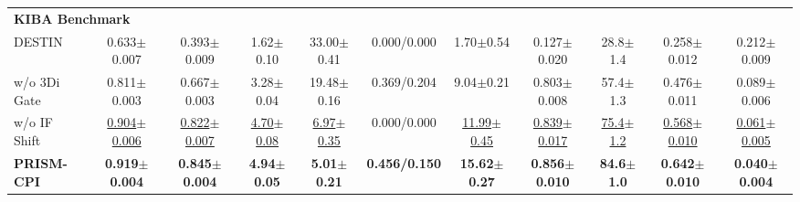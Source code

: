 \begin{table}[H]
{{\begin{tabular}{l cccccccccc}
\midrule
\multicolumn{11}{l}{\textbf{KIBA Benchmark}} \\
\hspace{3pt}DESTIN & 0.633${\pm}$0.007 & 0.393${\pm}$0.009 & 1.62${\pm}$0.10 & 33.00${\pm}$0.41 & 0.000/0.000 & 1.70${\pm}$0.54 & 0.127${\pm}$0.020 & 28.8${\pm}$1.4 & 0.258${\pm}$0.012 & 0.212${\pm}$0.009 \\
\hspace{3pt}w/o 3Di Gate & 0.811${\pm}$0.003 & 0.667${\pm}$0.003 & 3.28${\pm}$0.04 & 19.48${\pm}$0.16 & 0.369/0.204 & 9.04${\pm}$0.21 & 0.803${\pm}$0.008 & 57.4${\pm}$1.3 & 0.476${\pm}$0.011 & 0.089${\pm}$0.006 \\
\hspace{3pt}w/o IF Shift & \underline{0.904${\pm}$0.006} & \underline{0.822${\pm}$0.007} & \underline{4.70${\pm}$0.08} & \underline{6.97${\pm}$0.35} & 0.000/0.000 & \underline{11.99${\pm}$0.45} & \underline{0.839${\pm}$0.017} & \underline{75.4${\pm}$1.2} & \underline{0.568${\pm}$0.010} & \underline{0.061${\pm}$0.005} \\
\hspace{3pt}\textbf{PRISM-CPI} & \textbf{0.919${\pm}$0.004} & \textbf{0.845${\pm}$0.004} & \textbf{4.94${\pm}$0.05} & \textbf{5.01${\pm}$0.21} & \textbf{0.456/0.150} & \textbf{15.62${\pm}$0.27} & \textbf{0.856${\pm}$0.010} & \textbf{84.6${\pm}$1.0} & \textbf{0.642${\pm}$0.010} & \textbf{0.040${\pm}$0.004} \\
\bottomrule
\end{tabular}%
}}
\end{table}
